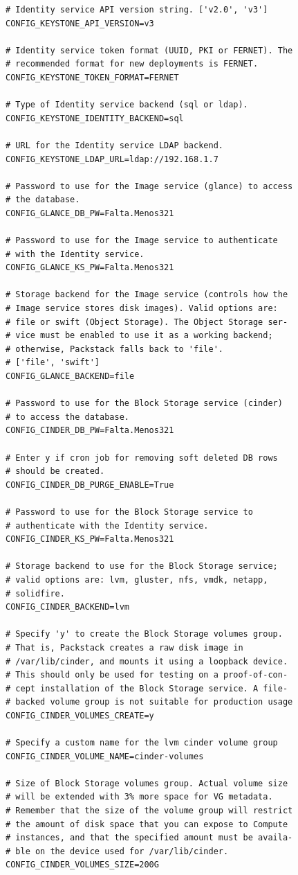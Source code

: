 \documentclass[12pt,a4paper,oneside]{book}
\begin{document}
\begin{lstlisting}[style=codigobase,  caption= answers.cfg]
# Identity service API version string. ['v2.0', 'v3']
CONFIG_KEYSTONE_API_VERSION=v3

# Identity service token format (UUID, PKI or FERNET). The
# recommended format for new deployments is FERNET. 
CONFIG_KEYSTONE_TOKEN_FORMAT=FERNET

# Type of Identity service backend (sql or ldap).
CONFIG_KEYSTONE_IDENTITY_BACKEND=sql

# URL for the Identity service LDAP backend.
CONFIG_KEYSTONE_LDAP_URL=ldap://192.168.1.7

# Password to use for the Image service (glance) to access
# the database.
CONFIG_GLANCE_DB_PW=Falta.Menos321

# Password to use for the Image service to authenticate 
# with the Identity service.
CONFIG_GLANCE_KS_PW=Falta.Menos321

# Storage backend for the Image service (controls how the
# Image service stores disk images). Valid options are: 
# file or swift (Object Storage). The Object Storage ser-
# vice must be enabled to use it as a working backend; 
# otherwise, Packstack falls back to 'file'.
# ['file', 'swift']
CONFIG_GLANCE_BACKEND=file

# Password to use for the Block Storage service (cinder) 
# to access the database.
CONFIG_CINDER_DB_PW=Falta.Menos321

# Enter y if cron job for removing soft deleted DB rows 
# should be created.
CONFIG_CINDER_DB_PURGE_ENABLE=True

# Password to use for the Block Storage service to 
# authenticate with the Identity service.
CONFIG_CINDER_KS_PW=Falta.Menos321

# Storage backend to use for the Block Storage service;
# valid options are: lvm, gluster, nfs, vmdk, netapp, 
# solidfire.
CONFIG_CINDER_BACKEND=lvm

# Specify 'y' to create the Block Storage volumes group. 
# That is, Packstack creates a raw disk image in 
# /var/lib/cinder, and mounts it using a loopback device.
# This should only be used for testing on a proof-of-con-
# cept installation of the Block Storage service. A file-
# backed volume group is not suitable for production usage
CONFIG_CINDER_VOLUMES_CREATE=y

# Specify a custom name for the lvm cinder volume group
CONFIG_CINDER_VOLUME_NAME=cinder-volumes

# Size of Block Storage volumes group. Actual volume size 
# will be extended with 3% more space for VG metadata. 
# Remember that the size of the volume group will restrict
# the amount of disk space that you can expose to Compute 
# instances, and that the specified amount must be availa-
# ble on the device used for /var/lib/cinder.
CONFIG_CINDER_VOLUMES_SIZE=200G


\end{lstlisting}
\end{document}
